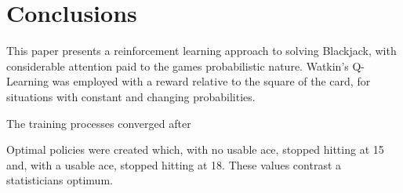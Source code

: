 \section{Conclusions}

This paper presents a reinforcement learning approach to solving Blackjack, with considerable attention paid to the games probabilistic nature. Watkin's Q-Learning was employed with a reward relative to the square of the card, for situations with constant and changing probabilities. 

The training processes converged after 

Optimal policies were created which, with no usable ace, stopped hitting at 15 and, with a usable ace, stopped hitting at 18. These values contrast a statisticians optimum. 
